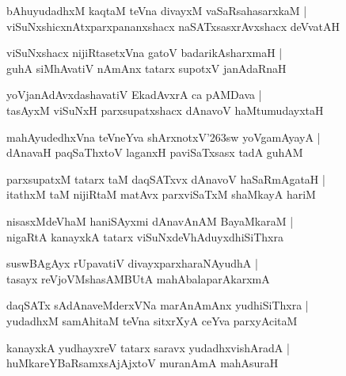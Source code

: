 \documentclass[twoside,12pt,openright]{book}
\def\S{\char'263}
\newcounter{shloka}[chapter]
\begin{document}
\begin{shloka}%
bAhuyudadhxM kaqtaM teVna divayxM vaSaRsahasarxkaM |\\
viSuNxshicxnAtxparxpananxshacx naSATxsasxrAvxshacx deVvatAH 
\end{shloka}

\begin{shloka}%
viSuNxshacx nijiRtasetxVna gatoV badarikAsharxmaH |\\
guhA siMhAvatiV nAmAnx tatarx supotxV janAdaRnaH
\end{shloka}

\begin{shloka}%
yoVjanAdAvxdashavatiV EkadAvxrA ca pAMDava |\\
tasAyxM viSuNxH parxsupatxshacx dAnavoV haMtumudayxtaH 
\end{shloka}

\begin{shloka}%
mahAyudedhxVna teVneYva shArxnotxV\S sw yoVgamAyayA |\\
dAnavaH paqSaThxtoV laganxH paviSaTxsasx tadA guhAM
\end{shloka}

\begin{shloka}%
parxsupatxM tatarx taM daqSATxvx dAnavoV haSaRmAgataH |\\
itathxM taM nijiRtaM matAvx parxviSaTxM shaMkayA hariM 
\end{shloka}

\begin{shloka}%
nisasxMdeVhaM haniSAyxmi dAnavAnAM BayaMkaraM |\\
nigaRtA kanayxkA tatarx viSuNxdeVhAduyxdhiSiThxra
\end{shloka}

\begin{shloka}%
suswBAgAyx rUpavatiV divayxparxharaNAyudhA |\\
tasayx reVjoVMshasAMBUtA mahAbalaparAkarxmA
\end{shloka}

\begin{shloka}%
daqSATx sAdAnaveMderxVNa marAnAmAnx yudhiSiThxra |\\
yudadhxM samAhitaM teVna sitxrXyA ceYva parxyAcitaM 
\end{shloka}

\begin{shloka}%
kanayxkA yudhayxreV tatarx saravx yudadhxvishAradA |\\
huMkareYBaRsamxsAjAjxtoV muranAmA mahAsuraH 
\end{shloka}
\end{document}
